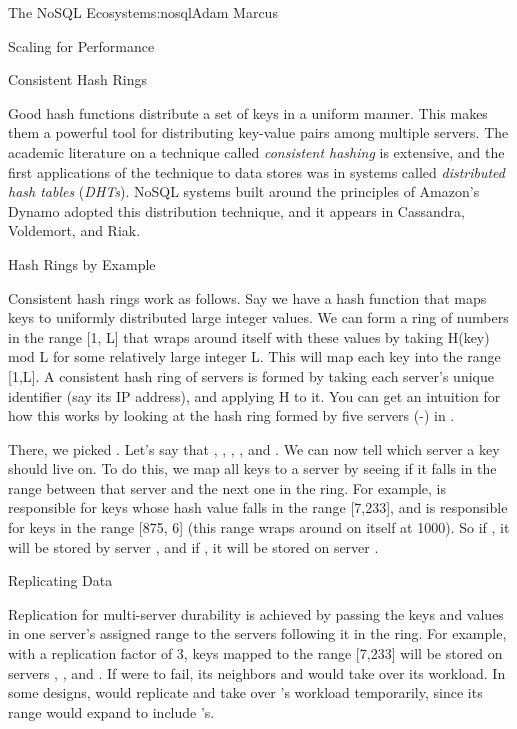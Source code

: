 \begin{aosachapter}{The NoSQL Ecosystem}{s:nosql}{Adam Marcus}
\begin{aosasect1}{Scaling for Performance}
\begin{aosasect2}{Consistent Hash Rings}

Good hash functions distribute a set of keys in a uniform manner.
This makes them a powerful tool for distributing key-value pairs
among multiple servers.  The academic literature on a technique
called \emph{consistent hashing} is extensive, and the first
applications of the technique to data stores was in systems called
\emph{distributed hash tables} (\emph{DHTs}).  NoSQL systems built
around the principles of Amazon's Dynamo adopted this distribution
technique, and it appears in Cassandra, Voldemort, and Riak.

\begin{aosasect3}{Hash Rings by Example}


Consistent hash rings work as follows.  Say we have a hash function
 that maps keys to uniformly distributed large integer values.  We
can form a ring of numbers in the range [1, L] that wraps around
itself with these values by taking H(key) mod L for some relatively
large integer L\@.  This will map each key into the range [1,L].  A
consistent hash ring of servers is formed by taking each server's
unique identifier (say its IP address), and applying H to it.  You can
get an intuition for how this works by looking at the hash ring formed
by five servers (-) in .

There, we picked .  Let's say that , , , , and .  We can now tell which
server a key should live on.  To do this, we map all keys to a server
by seeing if it falls in the range between that server and the next
one in the ring.  For example,  is responsible for keys whose
hash value falls in the range [7,233], and  is responsible for
keys in the range [875, 6] (this range wraps around on itself at
1000).  So if , it will be stored by
server , and if , it will be
stored on server .

\end{aosasect3}

\begin{aosasect3}{Replicating Data}

Replication for multi-server durability is achieved by passing the
keys and values in one server's assigned range to the servers
following it in the ring.  For example, with a replication factor of
3, keys mapped to the range [7,233] will be stored on servers
, , and .  If  were to fail, its
neighbors  and  would take over its workload.  In some designs,
 would replicate and take over 's workload temporarily, 
since its range would expand to include 's.


\end{aosasect3}
\end{aosasect2}
\end{aosasect1}
\end{aosachapter}
